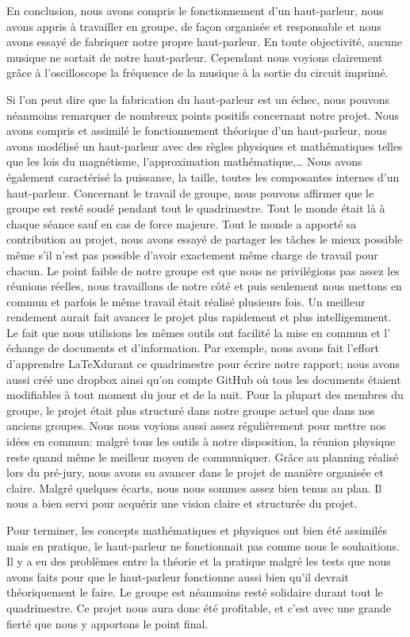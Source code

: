 


En conclusion, nous avons compris le fonctionnement d’un haut-parleur, 
nous avons appris à travailler en groupe, de façon organisée et responsable
et nous avons essayé de fabriquer notre propre haut-parleur. 
En toute objectivité, aucune musique ne sortait de notre haut-parleur.  
Cependant nous voyions clairement grâce à l’oscilloscope la fréquence de 
la musique à la sortie du circuit imprimé.

Si l’on peut dire que la fabrication du haut-parleur est un échec, nous pouvons
néanmoins remarquer de nombreux points positifs concernant notre projet.
Nous avons compris et assimilé le fonctionnement théorique d’un haut-parleur, 
nous avons modélisé un haut-parleur avec des règles physiques et mathématiques 
telles que les lois du magnétisme, l’approximation mathématique,…  Nous avons également
caractérisé la puissance, la taille, toutes les composantes internes d’un haut-parleur. 
Concernant le travail de groupe, nous pouvons affirmer que le groupe est resté soudé
pendant tout le quadrimestre.  Tout le monde était là à chaque séance sauf en cas
de force majeure.  Tout le monde a apporté sa contribution au projet, nous avons essayé de
partager les tâches le mieux possible même s’il n’est pas possible d’avoir 
exactement même charge de travail pour chacun.  Le point faible de notre groupe est 
que nous ne privilégions pas assez les réunions réelles, nous travaillons de notre 
côté et puis seulement nous mettons en commun et parfois le même travail était 
réalisé plusieurs fois.  Un meilleur rendement aurait fait avancer le projet plus 
rapidement et plus intelligemment. 
Le fait que nous utilisions les mêmes outils ont facilité la mise en commun et l’
échange de documents et d’information. Par exemple, nous avons fait l’effort d’apprendre 
\LaTeX durant ce quadrimestre pour écrire notre rapport; nous avons aussi
créé une dropbox ainsi qu’on compte GitHub où tous les documents étaient modifiables à 
tout moment du jour et de la nuit.  Pour la plupart des membres du groupe, le projet était 
plus structuré dans notre groupe actuel que dans nos anciens groupes.  Nous nous voyions aussi 
assez régulièrement pour mettre nos idées en commun: malgré tous les outils à notre 
disposition, la réunion physique reste quand même le meilleur moyen de communiquer.
Grâce au planning réalisé lors du pré-jury, nous avons su avancer dans le projet de manière
organisée et claire.  Malgré quelques écarts, nous nous sommes assez bien tenus au plan.
Il  nous a bien servi pour acquérir une vision claire et structurée du projet. 

Pour terminer, les concepts mathématiques et physiques ont bien été assimilés mais en 
pratique, le haut-parleur ne fonctionnait pas comme nous le souhaitions.  Il y a eu des
problèmes entre la théorie et la pratique malgré les tests que nous avons faits pour que 
le haut-parleur fonctionne aussi bien qu’il devrait théoriquement le faire.  Le groupe 
est néanmoins resté solidaire durant tout le quadrimestre. Ce projet nous aura donc été
profitable, et c'est avec une grande fierté que nous y apportons le point final.

